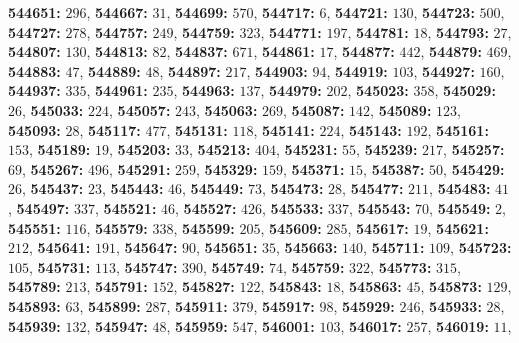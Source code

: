 \textsf{\bfseries 544651:} $296$, \textsf{\bfseries 544667:} $31$, \textsf{\bfseries 544699:} $570$, \textsf{\bfseries 544717:} $6$, \textsf{\bfseries 544721:} $130$, \textsf{\bfseries 544723:} $500$, \textsf{\bfseries 544727:} $278$, \textsf{\bfseries 544757:} $249$, \textsf{\bfseries 544759:} $323$, \textsf{\bfseries 544771:} $197$, \textsf{\bfseries 544781:} $18$, \textsf{\bfseries 544793:} $27$, \textsf{\bfseries 544807:} $130$, \textsf{\bfseries 544813:} $82$, \textsf{\bfseries 544837:} $671$, \textsf{\bfseries 544861:} $17$, \textsf{\bfseries 544877:} $442$, \textsf{\bfseries 544879:} $469$, \textsf{\bfseries 544883:} $47$, \textsf{\bfseries 544889:} $48$, \textsf{\bfseries 544897:} $217$, \textsf{\bfseries 544903:} $94$, \textsf{\bfseries 544919:} $103$, \textsf{\bfseries 544927:} $160$, \textsf{\bfseries 544937:} $335$, \textsf{\bfseries 544961:} $235$, \textsf{\bfseries 544963:} $137$, \textsf{\bfseries 544979:} $202$, \textsf{\bfseries 545023:} $358$, \textsf{\bfseries 545029:} $26$, \textsf{\bfseries 545033:} $224$, \textsf{\bfseries 545057:} $243$, \textsf{\bfseries 545063:} $269$, \textsf{\bfseries 545087:} $142$, \textsf{\bfseries 545089:} $123$, \textsf{\bfseries 545093:} $28$, \textsf{\bfseries 545117:} $477$, \textsf{\bfseries 545131:} $118$, \textsf{\bfseries 545141:} $224$, \textsf{\bfseries 545143:} $192$, \textsf{\bfseries 545161:} $153$, \textsf{\bfseries 545189:} $19$, \textsf{\bfseries 545203:} $33$, \textsf{\bfseries 545213:} $404$, \textsf{\bfseries 545231:} $55$, \textsf{\bfseries 545239:} $217$, \textsf{\bfseries 545257:} $69$, \textsf{\bfseries 545267:} $496$, \textsf{\bfseries 545291:} $259$, \textsf{\bfseries 545329:} $159$, \textsf{\bfseries 545371:} $15$, \textsf{\bfseries 545387:} $50$, \textsf{\bfseries 545429:} $26$, \textsf{\bfseries 545437:} $23$, \textsf{\bfseries 545443:} $46$, \textsf{\bfseries 545449:} $73$, \textsf{\bfseries 545473:} $28$, \textsf{\bfseries 545477:} $211$, \textsf{\bfseries 545483:} $41$, \textsf{\bfseries 545497:} $337$, \textsf{\bfseries 545521:} $46$, \textsf{\bfseries 545527:} $426$, \textsf{\bfseries 545533:} $337$, \textsf{\bfseries 545543:} $70$, \textsf{\bfseries 545549:} $2$, \textsf{\bfseries 545551:} $116$, \textsf{\bfseries 545579:} $338$, \textsf{\bfseries 545599:} $205$, \textsf{\bfseries 545609:} $285$, \textsf{\bfseries 545617:} $19$, \textsf{\bfseries 545621:} $212$, \textsf{\bfseries 545641:} $191$, \textsf{\bfseries 545647:} $90$, \textsf{\bfseries 545651:} $35$, \textsf{\bfseries 545663:} $140$, \textsf{\bfseries 545711:} $109$, \textsf{\bfseries 545723:} $105$, \textsf{\bfseries 545731:} $113$, \textsf{\bfseries 545747:} $390$, \textsf{\bfseries 545749:} $74$, \textsf{\bfseries 545759:} $322$, \textsf{\bfseries 545773:} $315$, \textsf{\bfseries 545789:} $213$, \textsf{\bfseries 545791:} $152$, \textsf{\bfseries 545827:} $122$, \textsf{\bfseries 545843:} $18$, \textsf{\bfseries 545863:} $45$, \textsf{\bfseries 545873:} $129$, \textsf{\bfseries 545893:} $63$, \textsf{\bfseries 545899:} $287$, \textsf{\bfseries 545911:} $379$, \textsf{\bfseries 545917:} $98$, \textsf{\bfseries 545929:} $246$, \textsf{\bfseries 545933:} $28$, \textsf{\bfseries 545939:} $132$, \textsf{\bfseries 545947:} $48$, \textsf{\bfseries 545959:} $547$, \textsf{\bfseries 546001:} $103$, \textsf{\bfseries 546017:} $257$, \textsf{\bfseries 546019:} $11$, 
